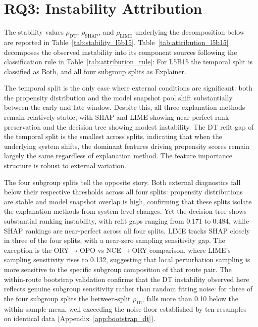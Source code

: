 \documentclass[oneside]{memoir} %
\begin{document}
\section{RQ3: Instability Attribution}

The stability values $\rho_{\text{DT}}$, $\rho_{\text{SHAP}}$, and $\rho_{\text{LIME}}$ underlying the decomposition below are reported in Table~\ref{tab:stability_l5b15}. Table~\ref{tab:attribution_l5b15} decomposes the observed instability into its component sources following the classification rule in Table~\ref{tab:attribution_rule}: For L5B15 the temporal split is classified as Both, and all four subgroup splits as Explainer.



The temporal split is the only case where external conditions are significant: both the propensity distribution and the model snapshot pool shift substantially between the early and late window. Despite this, all three explanation methods remain relatively stable, with SHAP and LIME showing near-perfect rank preservation and the decision tree showing modest instability. The DT refit gap of the temporal split is the smallest across splits, indicating that when the underlying system shifts, the dominant features driving propensity scores remain largely the same regardless of explanation method. The feature importance structure is robust to external variation.

The four subgroup splits tell the opposite story. Both external diagnostics fall below their respective thresholds across all four splits: propensity distributions are stable and model snapshot overlap is high, confirming that these splits isolate the explanation methods from system-level changes. Yet the decision tree shows substantial ranking instability, with refit gaps ranging from 0.171 to 0.484, while SHAP rankings are near-perfect across all four splits. LIME tracks SHAP closely in three of the four splits, with a near-zero sampling sensitivity gap. The exception is the ORY$\to$OPO vs NCE$\to$ORY comparison, where LIME's sampling sensitivity rises to 0.132, suggesting that local perturbation sampling is more sensitive to the specific subgroup composition of that route pair. The within-route bootstrap validation confirms that the DT instability observed here reflects genuine subgroup sensitivity rather than random fitting noise: for three of the four subgroup splits the between-split $\rho_{\text{DT}}$ falls more than 0.10 below the within-sample mean, well exceeding the noise floor established by ten resamples on identical data (Appendix~\ref{app:bootstrap_dt}).
\end{document}
